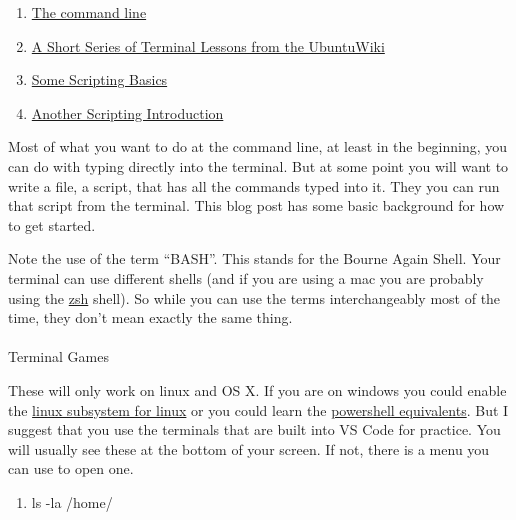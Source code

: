 \documentclass[
  letterpaper,
  DIV=11,
  numbers=noendperiod]{scrreprt}
\makeatletter
\let\oldparagraph\paragraph
\renewcommand{\paragraph}{
    \@ifstar
      \xxxParagraphStar
      \xxxParagraphNoStar
  }
\newcommand{\xxxParagraphStar}[1]{\oldparagraph*{#1}\mbox{}}
\newcommand{\xxxParagraphNoStar}[1]{\oldparagraph{#1}\mbox{}}
\providecommand{\tightlist}{%
  \setlength{\itemsep}{0pt}\setlength{\parskip}{0pt}}\usepackage{longtable,booktabs,array}
\makeatother
\begin{document}
\begin{enumerate}
\def\labelenumi{\arabic{enumi}.}
\tightlist
\item
  \href{https://ryanstutorials.net/linuxtutorial/commandline.php}{The
  command line}
\item
  \href{https://ubuntu.com/tutorials/command-line-for-beginners\#1-overview}{A
  Short Series of Terminal Lessons from the UbuntuWiki}
\item
  \href{https://null-byte.wonderhowto.com/how-to/hack-like-pro-scripting-for-aspiring-hacker-part-1-bash-basics-0149422/}{Some
  Scripting Basics}
\item
  \href{https://hpc-carpentry.github.io/hpc-shell/05-scripts/index.html}{Another
  Scripting Introduction}
\end{enumerate}

Most of what you want to do at the command line, at least in the
beginning, you can do with typing directly into the terminal. But at
some point you will want to write a file, a script, that has all the
commands typed into it. They you can run that script from the terminal.
This blog post has some basic background for how to get started.

Note the use of the term ``BASH''. This stands for the Bourne Again
Shell. Your terminal can use different shells (and if you are using a
mac you are probably using the \href{https://ohmyz.sh/}{zsh} shell). So
while you can use the terms interchangeably most of the time, they don't
mean exactly the same thing.

\paragraph{Terminal Games}\label{terminal-games}

These will only work on linux and OS X. If you are on windows you could
enable the
\href{https://learn.microsoft.com/en-us/windows/wsl/install}{linux
subsystem for linux} or you could learn the
\href{https://mathieubuisson.github.io/powershell-linux-bash/}{powershell
equivalents}. But I suggest that you use the terminals that are built
into VS Code for practice. You will usually see these at the bottom of
your screen. If not, there is a menu you can use to open one.

\begin{enumerate}
\def\labelenumi{\arabic{enumi}.}
\tightlist
\item
  ls -la /home/
\end{enumerate}
\end{document}
